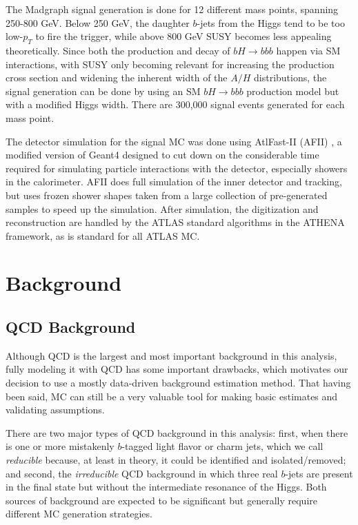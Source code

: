 



The Madgraph signal generation is done for 12 different mass points, spanning 250-800 GeV. Below 250 GeV, the daughter $b$-jets from the Higgs tend to be too low-$p_T$ to fire the trigger, while above 800 GeV SUSY becomes less appealing theoretically.  Since both the production and decay of $bH\rightarrow bbb$ happen via SM interactions, with SUSY only becoming relevant for increasing the production cross section and widening the inherent width of the $A/H$ distributions, the signal generation can be done by using an SM $bH\rightarrow bbb$ production model but with a modified Higgs width.  There are 300,000 signal events generated for each mass point.

The detector simulation for the signal MC was done using AtlFast-II (AFII) \cite{ATF2}, a modified version of Geant4 \cite{Geant4-1, Geant4-2} designed to cut down on the considerable time required for simulating particle interactions with the detector, especially showers in the calorimeter.  AFII does full simulation of the inner detector and tracking, but uses frozen shower shapes taken from a large collection of pre-generated samples to speed up the simulation.  After simulation, the digitization and reconstruction are handled by the ATLAS standard algorithms in the ATHENA framework, as is standard for all ATLAS MC.    

\section{Background}
\subsection{QCD Background}
Although QCD is the largest and most important background in this analysis, fully modeling it with QCD has some important drawbacks, which motivates our decision to use a mostly data-driven background estimation method.  That having been said, MC can still be a very valuable tool for making basic estimates and validating assumptions. 

There are two major types of QCD background in this analysis: first, when there is one or more mistakenly $b$-tagged light flavor or charm jets, which we call \textit{reducible} because, at least in theory, it could be identified and isolated/removed; and second, the \textit{irreducible} QCD background in which three real $b$-jets are present in the final state but without the intermediate resonance of the Higgs.  Both sources of background are expected to be significant but generally require different MC generation strategies.

